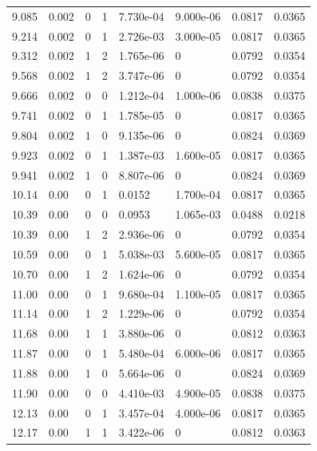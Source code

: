 \documentclass[preview]{standalone}
\begin{document}
{{{\begin{tabular}{L{1.2cm}C{1.2cm} C{0.3cm}C{0.5cm} C{1.4cm}C{1.4cm} C{1.4cm}C{1.4cm}}
  9.085  &  0.002  & 0     &  1 &  7.730e-04  & 9.000e-06  & 0.0817 &  0.0365   \\ 
  9.214  &  0.002  & 0     &  1 &  2.726e-03  & 3.000e-05  & 0.0817 &  0.0365   \\ 
  9.312  &  0.002  & 1     &  2 &  1.765e-06  & 0  & 0.0792 &  0.0354   \\ 
  9.568  &  0.002  & 1     &  2 &  3.747e-06  & 0  & 0.0792 &  0.0354   \\ 
  9.666  &  0.002  & 0     &  0 &  1.212e-04  & 1.000e-06  & 0.0838 &  0.0375   \\ 
  9.741  &  0.002  & 0     &  1 &  1.785e-05  & 0  & 0.0817 &  0.0365   \\ 
  9.804  &  0.002  & 1     &  0 &  9.135e-06  & 0  & 0.0824 &  0.0369   \\ 
  9.923  &  0.002  & 0     &  1 &  1.387e-03  & 1.600e-05  & 0.0817 &  0.0365   \\ 
  9.941  &  0.002  & 1     &  0 &  8.807e-06  & 0  & 0.0824 &  0.0369   \\ 
  10.14  &  0.00  & 0     &  1 &  0.0152  & 1.700e-04  & 0.0817 &  0.0365   \\ 
  10.39  &  0.00  & 0     &  0 &  0.0953  & 1.065e-03  & 0.0488 &  0.0218   \\ 
  10.39  &  0.00  & 1     &  2 &  2.936e-06  & 0  & 0.0792 &  0.0354   \\ 
  10.59  &  0.00  & 0     &  1 &  5.038e-03  & 5.600e-05  & 0.0817 &  0.0365   \\ 
  10.70  &  0.00  & 1     &  2 &  1.624e-06  & 0  & 0.0792 &  0.0354   \\ 
  11.00  &  0.00  & 0     &  1 &  9.680e-04  & 1.100e-05  & 0.0817 &  0.0365   \\ 
  11.14  &  0.00  & 1     &  2 &  1.229e-06  & 0  & 0.0792 &  0.0354   \\ 
  11.68  &  0.00  & 1     &  1 &  3.880e-06  & 0  & 0.0812 &  0.0363   \\ 
  11.87  &  0.00  & 0     &  1 &  5.480e-04  & 6.000e-06  & 0.0817 &  0.0365   \\ 
  11.88  &  0.00  & 1     &  0 &  5.664e-06  & 0  & 0.0824 &  0.0369   \\ 
  11.90  &  0.00  & 0     &  0 &  4.410e-03  & 4.900e-05  & 0.0838 &  0.0375   \\ 
  12.13  &  0.00  & 0     &  1 &  3.457e-04  & 4.000e-06  & 0.0817 &  0.0365   \\ 
  12.17  &  0.00  & 1     &  1 &  3.422e-06  & 0  & 0.0812 &  0.0363   \\ 

\end{tabular}}}}
\end{document}

